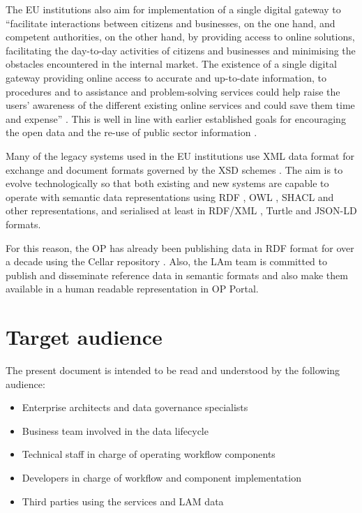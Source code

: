 	The EU institutions also aim for implementation of a single digital gateway to ``facilitate interactions between citizens and businesses, on the one hand, and competent authorities, on the other hand, by providing access to online solutions, facilitating the day-to-day activities of citizens and businesses and minimising the obstacles encountered in the internal market. The existence of a single digital gateway providing online access to accurate and up-to-date information, to procedures and to assistance and problem-solving services could help raise the users' awareness of the different existing online services and could save them time and expense'' \citep{directive-2018/1724}. This is well in line with earlier established goals for encouraging the open data and the re-use of public sector information \citep{directive-2013/37/EU,directive-2019/1024}.

	Many of the legacy systems used in the EU institutions use XML data format for exchange and document formats governed by the XSD schemes \citep{xsd1.1-spec}. The aim is to evolve technologically so that both existing and new systems are capable to operate with semantic data representations using RDF \citep{rdf11}, OWL \citep{owl2.0,owl2}, SHACL \citep{shacl-spec} and other representations, and serialised at least in RDF/XML \citep{rdf-xml-Beckett:04:RSS,rdf-xml-Schreiber:14:RXS}, Turtle \citep{turtle-Carothers:14:RT} and JSON-LD \citep{spornyjson,sporny2014json} formats.
	
	For this reason, the OP has already been publishing data in RDF format for over a decade using the Cellar repository \citep{cdm-francesconi2015ontology}. Also, the LAm team is committed to publish and disseminate reference data in semantic formats and also make them available in a human readable representation in OP Portal.
	
	\section{Target audience}
	\label{sec:audience}
	The present document is intended to be read and understood by the following audience:	
	\begin{itemize}
		\item Enterprise architects and data governance specialists
		\item Business team involved in the data lifecycle
		\item Technical staff in charge of operating workflow components
		\item Developers in charge of workflow and component implementation
		\item Third parties using the services and LAM data
	\end{itemize}	
	
